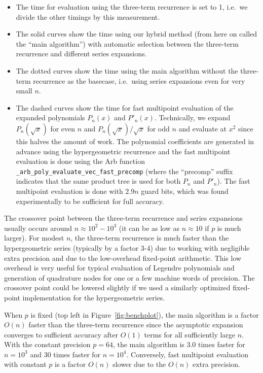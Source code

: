\documentclass[11pt,a4paper]{article}
\begin{document}
\begin{itemize}
\item The time for evaluation using the three-term recurrence is set to 1, i.e.\ we divide
the other timings by this measurement.
\item The solid curves show the time using our hybrid method
(from here on called the ``main algorithm'')
with automatic selection between the three-term
recurrence and different
series expansions.
\item The dotted curves show the time using the main algorithm without
the three-term recurrence as the basecase, i.e.\ using series expansions
even for very small $n$.
\item The dashed curves show the time for fast multipoint
evaluation of the expanded polynomials $P_n(x)$ and $P'_n(x)$.
Technically, we expand
$P_{n}(\sqrt{x})$ for even $n$ and $P_{n}(\sqrt{x})/\sqrt{x}$ for odd $n$
and evaluate at $x^2$ since this halves the amount of work.
The polynomial coefficients are generated in advance using
the hypergeometric recurrence and
the fast multipoint evaluation is done using
the Arb function \texttt{\_arb\_poly\_evaluate\_vec\_fast\_precomp}
(where the ``precomp'' suffix indicates that
the same product tree is used for both $P_n$ and $P'_n$).
The fast multipoint evaluation is done with $2.9n$ guard bits,
which was found experimentally to be sufficient for full accuracy.
\end{itemize}

The crossover point between the
three-term recurrence and series expansions usually occurs
around $n \approx 10^2 - 10^3$ (it can be as low as $n \approx 10$
if $p$ is much larger).
For modest $n$,
the three-term recurrence is much faster
than the hypergeometric series (typically by a factor 3-4)
due to working with negligible extra precision
and due to the low-overhead fixed-point arithmetic.
This low overhead is very useful for typical evaluation of
Legendre polynomials and generation of quadrature nodes
for one or a few machine words of precision.
The crossover point could be lowered slightly
if we used a similarly optimized fixed-point implementation
for the hypergeometric series.

When $p$ is fixed (top left in Figure~\ref{fig:benchplot}), the main algorithm is
a factor $O(n)$ faster
than the three-term recurrence
since the asymptotic expansion converges to sufficient accuracy after
$O(1)$ terms for all sufficiently large $n$.
With the constant precision $p = 64$,
the main algorithm is 3.0
times faster for $n = 10^3$ and 30 times faster for $n = 10^4$.
Conversely, fast multipoint evaluation
with constant $p$ is a factor $O(n)$ slower due to the $O(n)$ extra precision.
\end{document}

